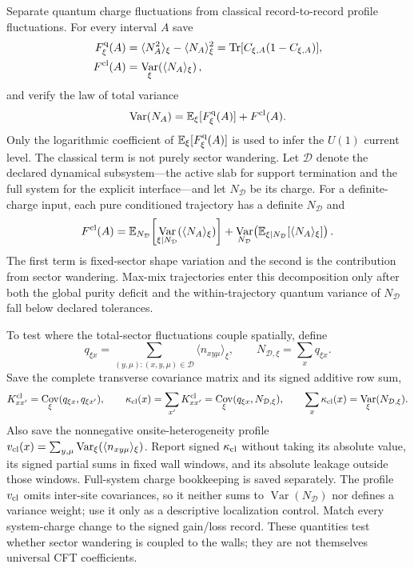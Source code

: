 \documentclass[aps,prx,onecolumn,nofootinbib,superscriptaddress,longbibliography]{revtex4-2}
\DeclareMathOperator{\Var}{Var}
\DeclareMathOperator{\Cov}{Cov}
\newcommand{\E}{\mathbb{E}}
\newcommand{\qTr}{\operatorname{Tr}}
\begin{document}
Separate quantum charge fluctuations from classical record-to-record profile fluctuations.  For every interval
$A$ save
\begin{align}
 F_{\xi}^{\rm q}(A)
 &=\langle N_A^2\rangle_\xi-\langle N_A\rangle_\xi^2
   =\qTr[C_{\xi,A}(1-C_{\xi,A})],\\
 F^{\rm cl}(A)
 &=\Var_\xi\!\left(\langle N_A\rangle_\xi\right),
\end{align}
and verify the law of total variance
\begin{equation}
 \Var(N_A)=\E_\xi[F_\xi^{\rm q}(A)]+F^{\rm cl}(A).
 \label{eq:total-charge-variance}
\end{equation}
Only the logarithmic coefficient of $\E_\xi[F_\xi^{\rm q}(A)]$ is used to infer the
$U(1)$ current level.  The classical term is not purely sector wandering.  Let
$\mathcal D$ denote the declared dynamical subsystem---the active slab for support
termination and the full system for the explicit interface---and let $N_{\mathcal D}$ be
its charge.  For a definite-charge input, each pure conditioned trajectory has a definite
$N_{\mathcal D}$ and
\begin{equation}
 F^{\rm cl}(A)
 =\E_{N_{\mathcal D}}\!\left[
   \Var_{\xi|N_{\mathcal D}}\!\left(\langle N_A\rangle_\xi\right)\right]
 +\Var_{N_{\mathcal D}}\!\left(
   \E_{\xi|N_{\mathcal D}}[\langle N_A\rangle_\xi]\right).
 \label{eq:classical-charge-decomposition}
\end{equation}
The first term is fixed-sector shape variation and the second is the contribution from
sector wandering.  Max-mix trajectories enter this decomposition only after both the
global purity deficit and the within-trajectory quantum variance of $N_{\mathcal D}$ fall
below declared tolerances.

To test where the total-sector fluctuations couple spatially, define
\begin{equation}
 q_{\xi x}=\sum_{(y,\mu):(x,y,\mu)\in\mathcal D}
 \langle n_{xy\mu}\rangle_\xi,
 \qquad N_{\mathcal D,\xi}=\sum_xq_{\xi x}.
\end{equation}
Save the complete transverse covariance matrix and its signed additive row sum,
\begin{equation}
 K_{xx'}^{\rm cl}=\Cov_\xi(q_{\xi x},q_{\xi x'}),
 \qquad
 \kappa_{\rm cl}(x)=\sum_{x'}K_{xx'}^{\rm cl}
 =\Cov_\xi(q_{\xi x},N_{\mathcal D,\xi}),
 \qquad
 \sum_x\kappa_{\rm cl}(x)=\Var_\xi(N_{\mathcal D,\xi}).
 \label{eq:classical-charge-profile}
\end{equation}
Also save the nonnegative onsite-heterogeneity profile
$v_{\rm cl}(x)=\sum_{y,\mu}\Var_\xi(\langle n_{xy\mu}\rangle_\xi)$.
Report signed $\kappa_{\rm cl}$ without taking its absolute value, its signed partial sums
in fixed wall windows, and its absolute leakage outside those windows.  Full-system charge
bookkeeping is saved separately.  The profile $v_{\rm cl}$ omits inter-site covariances, so
it neither sums to $\Var(N_{\mathcal D})$ nor defines a variance weight; use it only as a
descriptive localization control.  Match every system-charge change to the signed
gain/loss record.  These quantities test whether sector wandering is coupled to the walls;
they are not themselves universal CFT coefficients.
\end{document}
